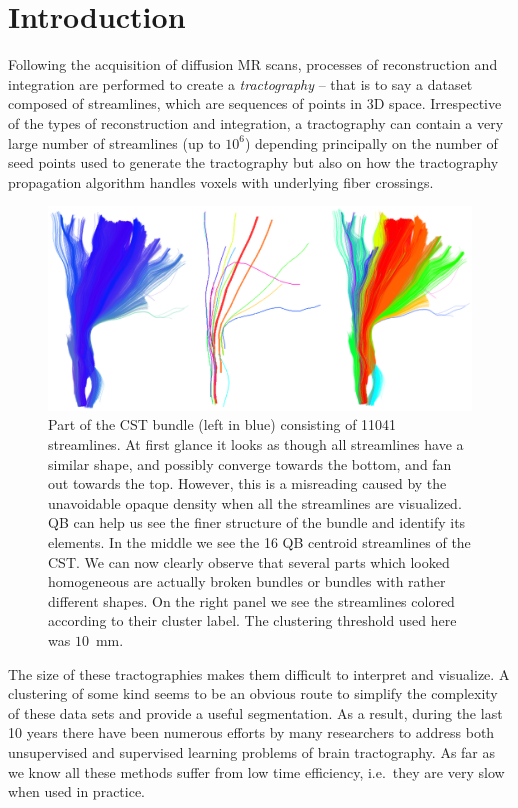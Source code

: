 \documentclass{bioinfo}
\begin{document}
\section{Introduction}

Following the acquisition of diffusion MR scans, processes of
reconstruction and integration are performed to create a
\emph{tractography} -- that is to say a dataset composed of streamlines,
which are sequences of points in 3D space. Irrespective of the types of
reconstruction and integration, a tractography can contain a very large
number of streamlines (up to $10^6$) depending principally on the number
of seed points used to generate the tractography but also on how the
tractography propagation algorithm handles voxels with underlying fiber
crossings.

\begin{figure}[htp]
\centerline{\includegraphics[width=160mm]{Figures/Fig_4_cst_simplification_relabeled_triple.eps}}
\caption{Part of the CST bundle (left in blue) consisting of \num{11041}
  streamlines. At first glance it looks as though all streamlines have a
  similar shape, and possibly converge towards the bottom, and fan out
  towards the top. However, this is a misreading caused by the
  unavoidable opaque density when all the streamlines are visualized.
  QB can help us see the finer structure of the bundle and identify its
  elements. In the middle we see the 16 QB centroid streamlines of the
  CST. We can now clearly observe that several parts which looked
  homogeneous are actually broken bundles or bundles with rather
  different shapes. On the right panel we see the streamlines colored
  according to their cluster label. The clustering threshold used here
  was $10$~mm. \label{Flo:cst_pbc}}
\end{figure}


The size of these tractographies makes them difficult to interpret and
visualize. A clustering of some kind seems to be an obvious route to
simplify the complexity of these data sets and provide a useful
segmentation. As a result, during the last 10 years there have been
numerous efforts by many researchers to address both unsupervised and
supervised learning problems of brain tractography.  As far as we know
all these methods suffer from low time efficiency, i.e.~they are very
slow when used in practice.
\end{document}
